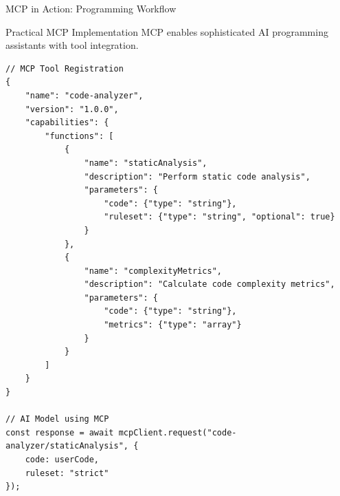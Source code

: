 \documentclass{beamer}
\begin{document}
\begin{frame}[t,fragile]{MCP in Action: Programming Workflow}
    \begin{block}{Practical MCP Implementation}
        MCP enables sophisticated AI programming assistants with tool integration.
    \end{block}
    
    \begin{lstlisting}[style=code, basicstyle=\ttfamily\tiny]
// MCP Tool Registration
{
    "name": "code-analyzer",
    "version": "1.0.0",
    "capabilities": {
        "functions": [
            {
                "name": "staticAnalysis",
                "description": "Perform static code analysis",
                "parameters": {
                    "code": {"type": "string"},
                    "ruleset": {"type": "string", "optional": true}
                }
            },
            {
                "name": "complexityMetrics",
                "description": "Calculate code complexity metrics",
                "parameters": {
                    "code": {"type": "string"},
                    "metrics": {"type": "array"}
                }
            }
        ]
    }
}

// AI Model using MCP
const response = await mcpClient.request("code-analyzer/staticAnalysis", {
    code: userCode,
    ruleset: "strict"
});
    \end{lstlisting}
\end{frame}
\end{document}
